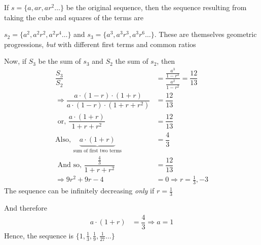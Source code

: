 \begin{solution}[\halfpage]
   If $s = \lbrace a, ar, ar^2 \ldots\rbrace$ be the original sequence, then the sequence
   resulting from taking the cube and squares of the terms are
   
   $s_2 = \lbrace a^2, a^2r^2,a^2r^4 \ldots \rbrace$ and $ s_3 = \lbrace a^3, a^3r^3, a^3r^6 \ldots \rbrace$.
   These are themselves geometric progressions, \textit{but} with different first terms and common ratios
   
   Now, if $S_3$ be the sum of $s_3$ and $S_2$ the sum of $s_2$, then
   \begin{align}
   		\dfrac{S_3}{S_2} &= \dfrac{\frac{a^3}{1-r^3}}{\frac{a^2}{1-r^2}} = \dfrac{12}{13} \\
   		\Rightarrow \dfrac{a\cdot(1-r)\cdot(1+r)}{a\cdot(1-r)\cdot(1+r+r^2)} &= \dfrac{12}{13} \\
   		\text{ or, } \dfrac{a\cdot(1+r)}{1+r+r^2} &= \dfrac{12}{13} \\
   		\text{Also, } \underbrace{a\cdot(1+r)}_{\text{sum of first two terms}} &= \dfrac{4}{3} \\
   		\text{ And so, } \dfrac{\frac{4}{3}}{1+r+r^2} &= \dfrac{12}{13} \\
   		\Rightarrow 9r^2 + 9r - 4 &= 0 \Rightarrow r = \frac{1}{3}, -3
   \end{align}
   The sequence can be infinitely decreasing \textit{only} if $r = \frac{1}{3}$
   
   And therefore 
   \begin{align}
   	a\cdot(1+r) &= \dfrac{4}{3} \Rightarrow a = 1
   \end{align}
   Hence, the sequence is $\lbrace 1, \frac{1}{3}, \frac{1}{9}, \frac{1}{27} \ldots\rbrace$
\end{solution}
